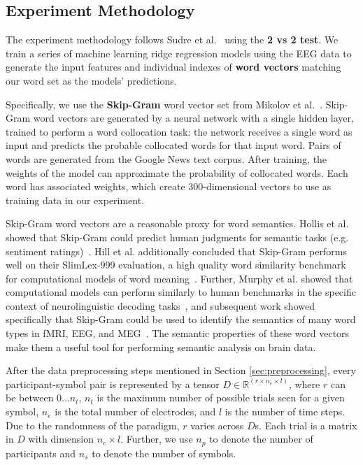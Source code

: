 \subsection{Experiment Methodology}
\label{sec:methodology}
The experiment methodology follows Sudre et al.~\cite{Sudre2012} using the {\bf 2 vs 2 test}. We train a series of machine learning ridge regression models using the EEG data to generate the input features and individual indexes of {\bf word vectors} matching our word set as the models' predictions.

Specifically, we use the {\bf Skip-Gram} word vector set from Mikolov et al.~\cite{Mikolov2013}. Skip-Gram word vectors are generated by a neural network with a single hidden layer, trained to perform a word collocation task: the network receives a single word as input and predicts the probable collocated words for that input word. Pairs of words are generated from the Google News text corpus. After training, the weights of the model can approximate the probability of collocated words. Each word has associated weights, which create 300-dimensional vectors to use as training data in our experiment.

 Skip-Gram word vectors are a reasonable proxy for word semantics. Hollis et al. showed that Skip-Gram could predict human judgments for semantic tasks (e.g. sentiment ratings)~\cite{hollis2017extrapolating}. Hill et al. additionally concluded that Skip-Gram performs well on their SlimLex-999 evaluation, a high quality word similarity benchmark for computational models of word meaning~\cite{hill2016simlex}. Further, Murphy et al. showed that computational models can perform similarly to human benchmarks in the specific context of neurolinguistic decoding tasks~\cite{Murphy2012}, and subsequent work showed specifically that Skip-Gram could be used to identify the semantics of many word types in fMRI, EEG, and MEG~\cite{xu2016brainbench}. The semantic properties of these word vectors make them a useful tool for performing semantic analysis on brain data.
   
After the data preprocessing steps mentioned in Section \ref{sec:preprocessing}, every participant-symbol pair is represented by a tensor $D \in \mathbb{R}^{(r \times n_e \times l)}$, where $r$ can be between $0 \ldots n_t$, $n_t$ is the maximum number of possible trials seen for a given symbol, $n_e$ is the total number of electrodes, and $l$ is the number of time steps. Due to the randomness of the paradigm, $r$ varies across $D$s. Each trial is a matrix in $D$ with dimension $n_e \times l$. Further, we use $n_p$ to denote the number of participants and $n_s$ to denote the number of symbols. 

